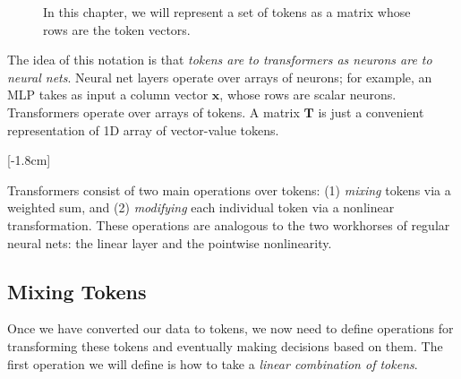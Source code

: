 \begin{figure}
{
  }
  \caption{In this chapter, we will represent a set of tokens as a matrix whose rows are the token vectors.}
  \label{fig:transformers:T_notation}
\end{figure}
\vspace{-0.4cm}

The idea of this notation is that \textit{tokens are to transformers as neurons are to neural nets}. Neural net layers operate over arrays of neurons; for example, an MLP takes as input a column vector $\mathbf{x}$, whose rows are scalar neurons. Transformers operate over arrays of tokens. A matrix $\mathbf{T}$ is just a convenient representation of 1D array of vector-value tokens.

[-1.8cm]

Transformers consist of two main operations over tokens: (1) \textit{mixing} tokens via a weighted sum, and (2) \textit{modifying} each individual token via a nonlinear transformation. These operations are analogous to the two workhorses of regular neural nets: the linear layer and the pointwise nonlinearity. %

\subsection{Mixing Tokens}
Once we have converted our data to tokens, we now need to define operations for transforming these tokens and eventually making decisions based on them. The first operation we will define is how to take a \textit{linear combination of tokens}.

